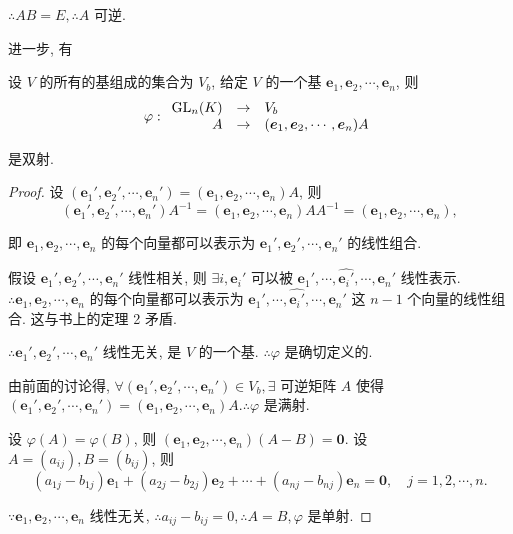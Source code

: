 \documentclass[color=black,device=normal,lang=cn,mode=geye]{elegantnote}
\begin{document}
$\therefore AB=E,\therefore A$ 可逆.

进一步, 有
\begin{theorem}\label{t1.1}
    设 $V$ 的所有的基组成的集合为 $V_b$, 给定 $V$ 的一个基 $\boldsymbol{e}_1,\boldsymbol{e}_2,\cdots,\boldsymbol{e}_n$, 则
    \[\varphi:\begin{array}{rcl}
        \operatorname{GL} _n(K) & \to & V_b \\
        A & \to & (\boldsymbol{e}_1,\boldsymbol{e}_2,\cdots,\boldsymbol{e}_n)A \\
    \end{array}\]

    是双射.
\end{theorem}
\begin{proof}
    设 $(\boldsymbol{e}_1',\boldsymbol{e}_2',\cdots,\boldsymbol{e}_n')=(\boldsymbol{e}_1,\boldsymbol{e}_2,\cdots,\boldsymbol{e}_n)A$, 则
    \[(\boldsymbol{e}_1',\boldsymbol{e}_2',\cdots,\boldsymbol{e}_n')A^{-1}=(\boldsymbol{e}_1,\boldsymbol{e}_2,\cdots,\boldsymbol{e}_n)AA^{-1}=(\boldsymbol{e}_1,\boldsymbol{e}_2,\cdots,\boldsymbol{e}_n),\]

    即 $\boldsymbol{e}_1,\boldsymbol{e}_2,\cdots,\boldsymbol{e}_n$ 的每个向量都可以表示为 $\boldsymbol{e}_1',\boldsymbol{e}_2',\cdots,\boldsymbol{e}_n'$ 的线性组合.

    假设 $\boldsymbol{e}_1',\boldsymbol{e}_2',\cdots,\boldsymbol{e}_n'$ 线性相关, 则 $\exists i,\boldsymbol{e}_i'$ 可以被 $\boldsymbol{e}_1',\cdots,\widehat{\boldsymbol{e}_i'},\cdots,\boldsymbol{e}_n'$ 线性表示. $\therefore\boldsymbol{e}_1,\boldsymbol{e}_2,\cdots,\boldsymbol{e}_n$ 的每个向量都可以表示为 $\boldsymbol{e}_1',\cdots,\widehat{\boldsymbol{e}_i'},\cdots,\boldsymbol{e}_n'$ 这 $n-1$ 个向量的线性组合. 这与书上的定理 2 矛盾.

    $\therefore\boldsymbol{e}_1',\boldsymbol{e}_2',\cdots,\boldsymbol{e}_n'$ 线性无关, 是 $V$ 的一个基. $\therefore\varphi$ 是确切定义的.

    由前面的讨论得, $\forall(\boldsymbol{e}_1',\boldsymbol{e}_2',\cdots,\boldsymbol{e}_n')\in V_b,\exists$ 可逆矩阵 $A$ 使得 $(\boldsymbol{e}_1',\boldsymbol{e}_2',\cdots,\boldsymbol{e}_n')=(\boldsymbol{e}_1,\boldsymbol{e}_2,\cdots,\boldsymbol{e}_n)A.\therefore\varphi$ 是满射.

    设 $\varphi(A)=\varphi(B)$, 则 $(\boldsymbol{e}_1,\boldsymbol{e}_2,\cdots,\boldsymbol{e}_n)(A-B)=\boldsymbol{0}$. 设 $A=(a_{ij}),B=(b_{ij})$, 则
    \[(a_{1j}-b_{1j})\boldsymbol{e}_1+(a_{2j}-b_{2j})\boldsymbol{e}_2+\cdots+(a_{nj}-b_{nj})\boldsymbol{e}_n=\boldsymbol{0},\quad j=1,2,\cdots,n.\]

    $\because\boldsymbol{e}_1,\boldsymbol{e}_2,\cdots,\boldsymbol{e}_n$ 线性无关, $\therefore a_{ij}-b_{ij}=0,\therefore A=B,\varphi$ 是单射.
\end{proof}
\end{document}
